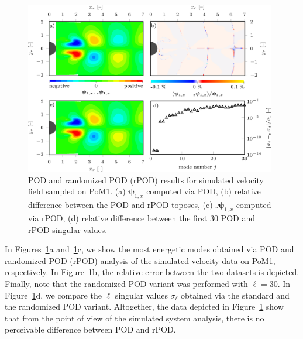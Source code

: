 \begin{figure}[htbp]
    \centering
    \includegraphics[width=0.98\textwidth]{02_images/00_export/figure4.png}
    \caption{POD and randomized POD (rPOD) results for simulated velocity field sampled on PoM1. (a) $\bm{\psi}_{1,x}$ computed via POD, (b) relative difference between the POD and rPOD toposes, (c) $_{\mathrm{r}}\bm{\psi}_{1,x}$ computed via rPOD, (d) relative difference between the first 30 POD and rPOD singular values.}
    \label{fig:podRandPODComp}
\end{figure}
In Figures~\ref{fig:podRandPODComp}a and~\ref{fig:podRandPODComp}c, we show the most energetic modes obtained via POD and randomized POD (rPOD) analysis of the simulated velocity data on PoM1, respectively. In Figure~\ref{fig:podRandPODComp}b, the relative error between the two datasets is depicted. Finally, note that the randomized POD variant was performed with $\ell = 30$. In Figure~\ref{fig:podRandPODComp}d, we compare the $\ell$ singular values $\sigma_{\ell}$ obtained via the standard and the randomized POD variant. Altogether, the data depicted in Figure~\ref{fig:podRandPODComp} show that from the point of view of the simulated system analysis, there is no perceivable difference between POD and rPOD.
